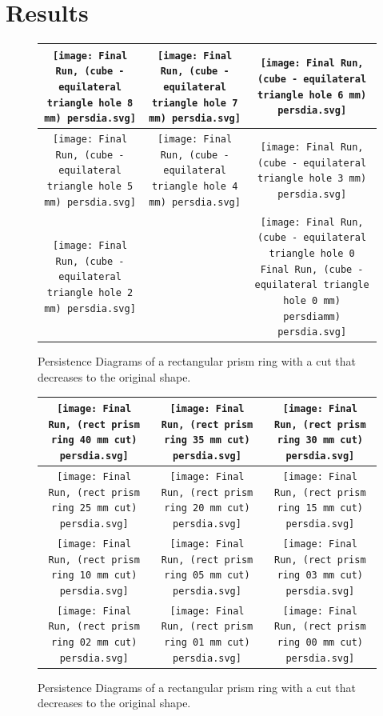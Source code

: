 \documentclass[ma]{uncgdissertationexp2}
\theoremstyle{plain}
\theoremstyle{definition}
\theoremstyle{remark}
\begin{document}
\chapter{Results}
\newpage
\begin{figure}
    \centering
    \begin{tabular}{|c|c|c|}
         \hline
         \texttt{[image: Final Run, (cube - equilateral triangle hole 8 mm) persdia.svg]} &
         \texttt{[image: Final Run, (cube - equilateral triangle hole 7 mm) persdia.svg]} &  
         \texttt{[image: Final Run, (cube - equilateral triangle hole 6 mm) persdia.svg]} \\
         \hline
         \texttt{[image: Final Run, (cube - equilateral triangle hole 5 mm) persdia.svg]} & 
         \texttt{[image: Final Run, (cube - equilateral triangle hole 4 mm) persdia.svg]} & 
         \texttt{[image: Final Run, (cube - equilateral triangle hole 3 mm) persdia.svg]} \\
         \hline
         \texttt{[image: Final Run, (cube - equilateral triangle hole 2 mm) persdia.svg]} & 
          & 
         \texttt{[image: Final Run, (cube - equilateral triangle hole 0 Final Run, (cube - equilateral triangle hole 0 mm) persdiamm) persdia.svg]} \\
         \hline
    \end{tabular}
    \caption{Persistence Diagrams of a rectangular prism ring with a cut that decreases to the original shape.}
    \label{fig:enter-label}
\end{figure}
\newpage
\begin{figure}
    \centering
    \begin{tabular}{|c|c|c|}
         \hline
         \texttt{[image: Final Run, (rect prism ring 40 mm cut) persdia.svg]} &
         \texttt{[image: Final Run, (rect prism ring 35 mm cut) persdia.svg]} &  
         \texttt{[image: Final Run, (rect prism ring 30 mm cut) persdia.svg]} \\
         \hline
         \texttt{[image: Final Run, (rect prism ring 25 mm cut) persdia.svg]} & 
         \texttt{[image: Final Run, (rect prism ring 20 mm cut) persdia.svg]} & 
         \texttt{[image: Final Run, (rect prism ring 15 mm cut) persdia.svg]} \\
         \hline
         \texttt{[image: Final Run, (rect prism ring 10 mm cut) persdia.svg]} & 
         \texttt{[image: Final Run, (rect prism ring 05 mm cut) persdia.svg]} & 
         \texttt{[image: Final Run, (rect prism ring 03 mm cut) persdia.svg]} \\
         \hline
         \texttt{[image: Final Run, (rect prism ring 02 mm cut) persdia.svg]} &
         \texttt{[image: Final Run, (rect prism ring 01 mm cut) persdia.svg]} &
         \texttt{[image: Final Run, (rect prism ring 00 mm cut) persdia.svg]} \\
         \hline
    \end{tabular}
    \caption{Persistence Diagrams of a rectangular prism ring with a cut that decreases to the original shape.}
    \label{fig:enter-label}
\end{figure}
\end{document}

